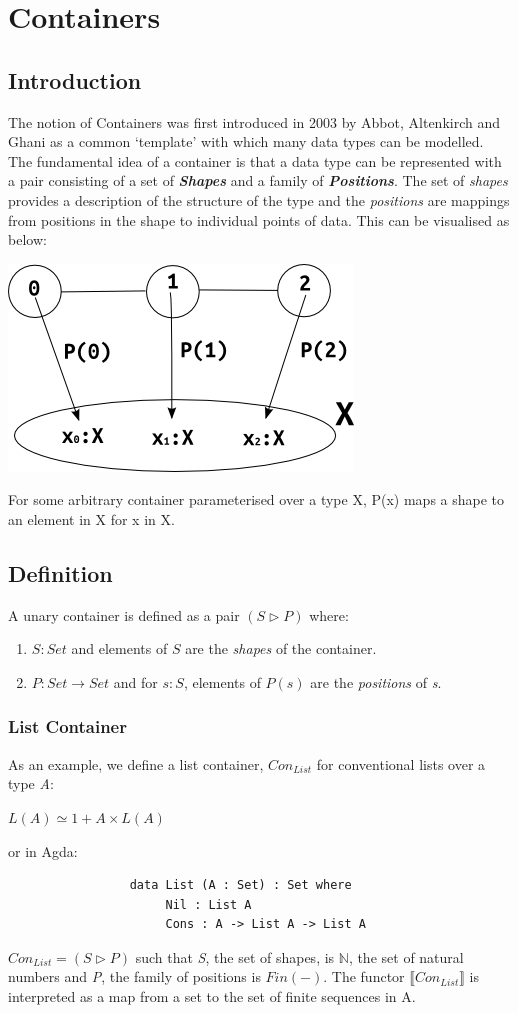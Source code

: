 \documentclass[12pt]{report}
\begin{document}
\chapter{Containers}
\section{Introduction}
The notion of Containers was first introduced in 2003 by Abbot, Altenkirch and Ghani\cite{coc} as a common `template' with which many data types can be modelled. The fundamental idea of a container is that a data type can be represented with a pair consisting of a set of \textit{\textbf{Shapes}} and a family of \textit{\textbf{Positions}}. The set of \textit{shapes} provides a description of the structure of the type and the \textit{positions} are mappings from positions in the shape to individual points of data. This can be visualised as below:
\begin{center}
\includegraphics[scale=0.65]{4.png}
\end{center}
For some arbitrary container parameterised over a type X, P(x) maps a shape to an element in X for x in X.
\section{Definition}
A unary container is defined as a pair $ (S \rhd P) $ where:
\begin{enumerate}
\item $S : Set$ and elements of $S$ are the \textit{shapes} of the container.
\item $P : Set \to Set$ and for $s : S$, elements of $P(s)$ are the \textit{positions} of \textit{s}.
\end{enumerate}

\subsection*{List Container}
As an example, we define a list container, $Con_{List}$ for conventional lists over a type \textit{A}:
\begin{center}
$ L(A) \simeq 1 + A \times L(A) $
\end{center}
or in Agda:
\begin{verbatim}
                 data List (A : Set) : Set where
                      Nil : List A
                      Cons : A -> List A -> List A
\end{verbatim}
 $Con_{List} = (S \rhd P) $ such that \textit{S}, the set of shapes, is $\mathbb{N}$, the set of natural numbers and \textit{P}, the family of positions is $Fin(-)$. The functor $\llbracket Con_{List} \rrbracket$ is interpreted as a map from a set to the set of finite sequences in A.
\end{document}
